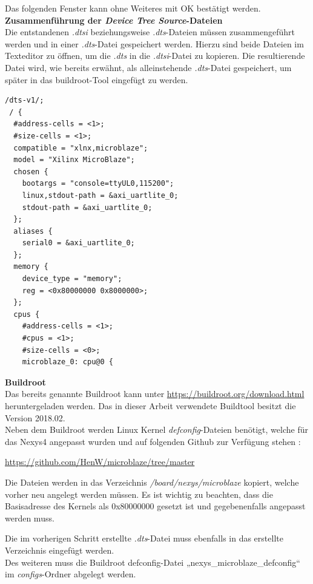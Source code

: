 Das folgenden Fenster kann ohne Weiteres mit OK bestätigt werden.\\


\textbf{Zusammenführung der \emph{Device Tree Source}-Dateien}\\

Die entstandenen \emph{.dtsi} beziehungsweise \emph{.dts}-Dateien müssen zusammengeführt werden und in einer \emph{.dts}-Datei gespeichert werden.
Hierzu sind beide Dateien im Texteditor zu öffnen, um die \emph{.dts}
 in die \emph{.dtsi}-Datei zu kopieren.
 Die resultierende Datei wird, wie bereits erwähnt, als alleinstehende \emph{.dts}-Datei gespeichert, um später in das buildroot-Tool eingefügt zu werden.\\

 \begin{lstlisting}[caption={Artix7.dts-Datei},label={code:artixdts}]
 /dts-v1/;
 / {
  #address-cells = <1>;
  #size-cells = <1>;
  compatible = "xlnx,microblaze";
  model = "Xilinx MicroBlaze";
  chosen {
    bootargs = "console=ttyUL0,115200";
    linux,stdout-path = &axi_uartlite_0;
    stdout-path = &axi_uartlite_0;
  };
  aliases {
    serial0 = &axi_uartlite_0;
  };
  memory {
    device_type = "memory";
    reg = <0x80000000 0x8000000>;
  };
  cpus {
    #address-cells = <1>;
    #cpus = <1>;
    #size-cells = <0>;
    microblaze_0: cpu@0 {
  \end{lstlisting}


\textbf{Buildroot}\\

Das bereits genannte Buildroot kann unter \url{https://buildroot.org/download.html} heruntergeladen werden.
Das in dieser Arbeit verwendete Buildtool besitzt die Version 2018.02.\\
Neben dem Buildroot werden Linux Kernel \emph{defconfig}-Dateien benötigt, welche für das Nexys4 angepasst wurden und auf folgenden Github zur Verfügung stehen :

\url{https://github.com/HenW/microblaze/tree/master}

Die Dateien werden in das Verzeichnis \emph{/board/nexys/microblaze} kopiert, welche vorher neu angelegt werden müssen.
 Es ist wichtig zu beachten, dass die Basisadresse des Kernels als 0x80000000 gesetzt ist und gegebenenfalls angepasst werden muss.

Die im vorherigen Schritt erstellte \emph{.dts}-Datei muss ebenfalls in das erstellte Verzeichnis eingefügt werden.\\

Des weiteren muss die Buildroot defconfig-Datei „nexys\_microblaze\_defconfig“ im \emph{configs}-Ordner abgelegt werden.\\

